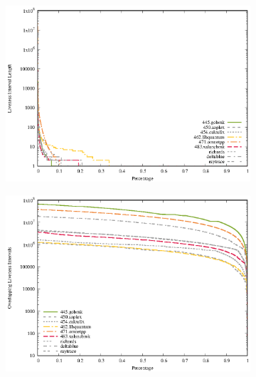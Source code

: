 \documentclass[onecolumn, openright, master, english, signatures]{dbrgrptt}
\begin{document}
\begin{figure}[!ht]
  \begin{subfigure}[b]{0.5\textwidth}%
    \includegraphics[width=\textwidth]{figs/statistical-analysis/plots/ll.eps}
    \label{fig:stats-liveness-interval-length}
  \end{subfigure}
  \begin{subfigure}[b]{0.5\textwidth}%
    \includegraphics[width=\textwidth]{figs/statistical-analysis/plots/ol.eps}
    \label{fig:stats-overlapping-liveness}
  \end{subfigure}
  \begin{subfigure}[b]{0.5\textwidth}%

\end{subfigure}
\end{figure}
\end{document}
